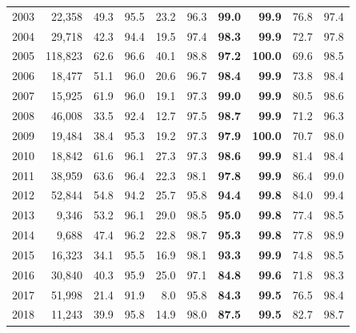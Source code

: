 {\begin{longtable}{rrrrrrrrrr}
2003 & 22,358 & 49.3 & 95.5 & 23.2 & 96.3 & \cellcolor{gray!15}\textbf{99.0} & \cellcolor{gray!15}\textbf{99.9} & 76.8 & 97.4 \\
2004 & 29,718 & 42.3 & 94.4 & 19.5 & 97.4 & \cellcolor{gray!15}\textbf{98.3} & \cellcolor{gray!15}\textbf{99.9} & 72.7 & 97.8 \\
2005 & 118,823 & 62.6 & 96.6 & 40.1 & 98.8 & \cellcolor{gray!15}\textbf{97.2} & \cellcolor{gray!15}\textbf{100.0} & 69.6 & 98.5 \\
2006 & 18,477 & 51.1 & 96.0 & 20.6 & 96.7 & \cellcolor{gray!15}\textbf{98.4} & \cellcolor{gray!15}\textbf{99.9} & 73.8 & 98.4 \\
2007 & 15,925 & 61.9 & 96.0 & 19.1 & 97.3 & \cellcolor{gray!15}\textbf{99.0} & \cellcolor{gray!15}\textbf{99.9} & 80.5 & 98.6 \\
2008 & 46,008 & 33.5 & 92.4 & 12.7 & 97.5 & \cellcolor{gray!15}\textbf{98.7} & \cellcolor{gray!15}\textbf{99.9} & 71.2 & 96.3 \\
2009 & 19,484 & 38.4 & 95.3 & 19.2 & 97.3 & \cellcolor{gray!15}\textbf{97.9} & \cellcolor{gray!15}\textbf{100.0} & 70.7 & 98.0 \\
2010 & 18,842 & 61.6 & 96.1 & 27.3 & 97.3 & \cellcolor{gray!15}\textbf{98.6} & \cellcolor{gray!15}\textbf{99.9} & 81.4 & 98.4 \\
2011 & 38,959 & 63.6 & 96.4 & 22.3 & 98.1 & \cellcolor{gray!15}\textbf{97.8} & \cellcolor{gray!15}\textbf{99.9} & 86.4 & 99.0 \\
2012 & 52,844 & 54.8 & 94.2 & 25.7 & 95.8 & \cellcolor{gray!15}\textbf{94.4} & \cellcolor{gray!15}\textbf{99.8} & 84.0 & 99.4 \\
2013 & 9,346 & 53.2 & 96.1 & 29.0 & 98.5 & \cellcolor{gray!15}\textbf{95.0} & \cellcolor{gray!15}\textbf{99.8} & 77.4 & 98.5 \\
2014 & 9,688 & 47.4 & 96.2 & 22.8 & 98.7 & \cellcolor{gray!15}\textbf{95.3} & \cellcolor{gray!15}\textbf{99.8} & 77.8 & 98.9 \\
2015 & 16,323 & 34.1 & 95.5 & 16.9 & 98.1 & \cellcolor{gray!15}\textbf{93.3} & \cellcolor{gray!15}\textbf{99.9} & 74.8 & 98.5 \\
2016 & 30,840 & 40.3 & 95.9 & 25.0 & 97.1 & \cellcolor{gray!15}\textbf{84.8} & \cellcolor{gray!15}\textbf{99.6} & 71.8 & 98.3 \\
2017 & 51,998 & 21.4 & 91.9 & 8.0 & 95.8 & \cellcolor{gray!15}\textbf{84.3} & \cellcolor{gray!15}\textbf{99.5} & 76.5 & 98.4 \\
2018 & 11,243 & 39.9 & 95.8 & 14.9 & 98.0 & \cellcolor{gray!15}\textbf{87.5} & \cellcolor{gray!15}\textbf{99.5} & 82.7 & 98.7 \\

\end{longtable}}
